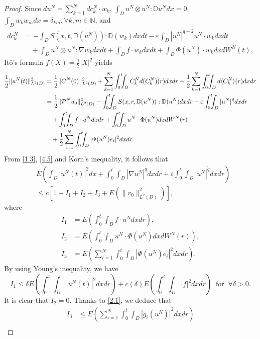 \documentclass[reqno]{amsart}
\theoremstyle{definition}
\theoremstyle{remark}
\numberwithin{equation}{section} \allowdisplaybreaks
\begin{document}
\begin{proof}
Since $du^N=\sum_{k=1}^N dc_k^N\cdot w_k$, $\int_{D}u^N\otimes u^N:
\mathbb{D}u^Ndx=0$,  $\int_Dw_kw_mdx=\delta_{km}, \forall k,m\in
\mathbb{N}$, and \begin{align*}
dc_k^N&=-\int_{D}S(x,t,\mathbb{D}(u^N)):\mathbb{D}(w_k)dxdt-\varepsilon\int_{D}|u^N|^{\tilde{q}-2}u^N\cdot
w_k dxdt\\&\quad+\int_{D}u^N\otimes u^N :\nabla w_kdxdt
+\int_{D}f\cdot w_k dxdt +\int_{D}\Phi(u^N)\cdot w_k dxdW^N(t),
\end{align*}
It\^{o}'s formula $f(X)=\frac{1}{2}|X|^2$ yields
\begin{align}\label{4.5}
\notag
\frac{1}{2}\|u^N(t)\|^2_{L^2(D)}&=\frac{1}{2}\|C^N(0)\|^2_{L^2(D)}+\sum_{k=1}^N\int_0^t\!\!\!\int_D
C_k^N d(C_k^N)(r)dxdr
+\frac{1}{2}\sum_{k=1}^N\int_0^t\!\!\!\int_Dd\langle C_k^N\rangle(r)dxdr\\
\notag&=\frac{1}{2}\|\mathcal{P}^Nu_0\|^2_{L^2(D)}-\int_0^t\!\!\!\int_DS(x,r,\mathbb{D}(u^N)):\mathbb{D}(u^N)dxdr-\varepsilon\int_0^t\!\!\!\int_D
|u^N|^{\tilde{q}}dxdr\\
&\quad+\int_0^t\!\!\!\int_Df\cdot u^Ndxdr+\int_0^t\!\!\!\int_D
u^N\cdot
\Phi(u^N) dxdW^N(r)\\
\notag&\quad+\frac{1}{2}\sum_{i=1}^N\int_0^t\!\!\!\int_D|\Phi(u^N)e_i|^2dxdr.
\end{align}
From \eqref{1.3}, \eqref{4.5} and Korn's inequality, it follows that
\begin{align*}
&E\left(\int_{D}|u^N(t)|^2dx+\int_0^t\!\!\!\int_D|\nabla u^N|^qdxdr+\varepsilon\int_0^t\!\!\!\int_D|u^N|^{\tilde{q}}dxdr\right)\\
&\leq c\left[1+I_1+I_2+I_3+E\left(\|v_0\|^2_{L^2(D)}\right)\right],
\end{align*}
where
\begin{align*}
I_1&=E\left(\int_0^t\!\!\!\int_Df\cdot u^Ndxdr\right),\\
I_2&=E\left(\int_0^t\!\!\!\int_Du^N\cdot \Phi(u^N)dxdW^N(r)\right),\\
I_3&=E\left(\sum_{i=1}^N\int_0^t\!\!\!\int_D|\Phi(u^N)e_i|^2dxdr
\right).
\end{align*}
By using Young's inequality, we have
$$I_1\leq\delta
E\left(\int_0^t\!\!\!\int_{D}|u^N(t)|^2dxdr\right)+c(\delta)E\left(\int_0^t\!\!\!\int_D|f|^2dxdr\right)~
\mbox{ for }~\forall\delta>0.$$ It is clear that $I_2=0$. Thanks to
\eqref{2.1}, we deduce that
\begin{equation*}
\begin{split}
I_3&\leq E\left(\sum_{i=1}^N\int_0^t\!\!\!\int_D|g_i(u^N)|^2dxdr\right)\\

\end{split}
\end{equation*}
\end{proof}
\end{document}
